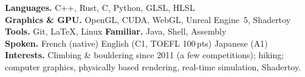 \documentclass[10pt,a4paper]{article}
\begin{document}
\textbf{Languages.} C++, Rust, C, Python, GLSL, HLSL\\[1pt]
\textbf{Graphics \& GPU.} OpenGL, CUDA, WebGL, Unreal Engine~5, Shadertoy\\[1pt]
\textbf{Tools.} Git, \LaTeX, Linux \quad{\color{accent}\textbullet}\quad \textbf{Familiar.} Java, Shell, Assembly\\[1pt]
\textbf{Spoken.} French (native) {\color{accent}\textbullet} English (C1, TOEFL 100\,pts) {\color{accent}\textbullet} Japanese (A1)\\[1pt]
\textbf{Interests.} Climbing \& bouldering since 2011 (a few competitions); hiking; computer graphics, physically based rendering, real-time simulation, Shadertoy.
\end{document}
